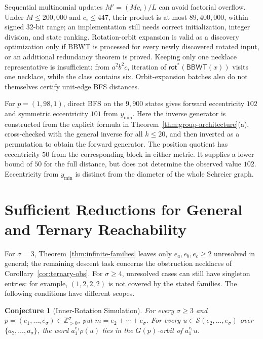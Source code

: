 \documentclass[11pt,a4paper]{article}
\newtheorem{conjecture}{Conjecture}
\theoremstyle{definition}
\newcommand{\BBWT}{\mathsf{BBWT}}
\newcommand{\rot}{\mathsf{rot}}
\begin{document}
Sequential multinomial updates $M'=(Mc_i)/L$ can avoid factorial overflow. Under $M\le200{,}000$ and $c_i\le447$, their product is at most $89{,}400{,}000$, within signed 32-bit range; an implementation still needs correct initialization, integer division, and state ranking. Rotation-orbit expansion is valid as a discovery optimization only if BBWT is processed for every newly discovered rotated input, or an additional redundancy theorem is proved. Keeping only one necklace representative is insufficient: from $a^2b^2c$, iteration of $\rot^*(\BBWT(x))$ visits one necklace, while the class contains six. Orbit-expansion batches also do not themselves certify unit-edge BFS distances.

For $p=(1,98,1)$, direct BFS on the $9{,}900$ states gives forward eccentricity $102$ and symmetric eccentricity $101$ from $y_{\min}$. Here the inverse generator is constructed from the explicit formula in Theorem~\ref{thm:group-architecture}(a), cross-checked with the general inverse for all $k\le20$, and then inverted as a permutation to obtain the forward generator. The position quotient has eccentricity $50$ from the corresponding block in either metric. It supplies a lower bound of $50$ for the full distance, but does not determine the observed value $102$. Eccentricity from $y_{\min}$ is distinct from the diameter of the whole Schreier graph.


\section{Sufficient Reductions for General and Ternary Reachability}
\label{sec:open}

For $\sigma=3$, Theorem~\ref{thm:infinite-families} leaves only $e_a,e_b,e_c\ge2$ unresolved in general; the remaining descent task concerns the obstruction necklaces of Corollary~\ref{cor:ternary-obs}. For $\sigma\ge4$, unresolved cases can still have singleton entries: for example, $(1,2,2,2)$ is not covered by the stated families. The following conditions have different scopes.

\begin{conjecture}[Inner-Rotation Simulation]
\label{conj:inner-rot}
For every $\sigma\ge3$ and $p=(e_1,\dots,e_\sigma)\in\mathbb{Z}_{>0}^\sigma$, put $m=e_2+\cdots+e_\sigma$. For every $u\in\mathcal{S}(e_2,\dots,e_\sigma)$ over $\{a_2,\dots,a_\sigma\}$, the word $a_1^{e_1}\rho(u)$ lies in the $G(p)$-orbit of $a_1^{e_1}u$.
\end{conjecture}
\end{document}
